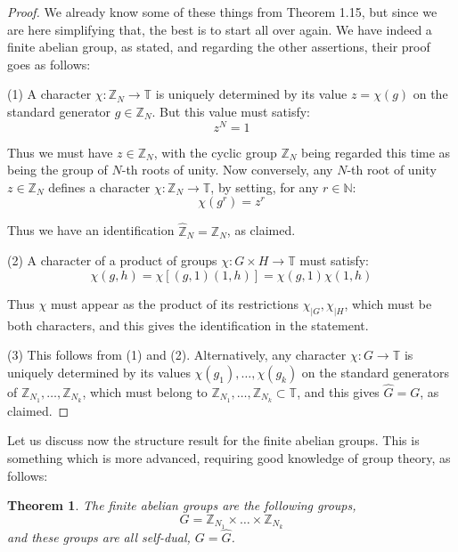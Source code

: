\documentclass[12pt]{amsbook}
\newtheorem{theorem}{Theorem}[chapter]
\begin{document}
\begin{proof}
We already know some of these things from Theorem 1.15, but since we are here simplifying that, the best is to start all over again. We have indeed a finite abelian group, as stated, and regarding the other assertions, their proof goes as follows:

\medskip

(1) A character $\chi:\mathbb Z_N\to\mathbb T$ is uniquely determined by its value $z=\chi(g)$ on the standard generator $g\in\mathbb Z_N$. But this value must satisfy:
$$z^N=1$$

Thus we must have $z\in\mathbb Z_N$, with the cyclic group $\mathbb Z_N$ being regarded this time as being the group of $N$-th roots of unity. Now conversely, any $N$-th root of unity $z\in\mathbb Z_N$ defines a character $\chi:\mathbb Z_N\to\mathbb T$, by setting, for any $r\in\mathbb N$:
$$\chi(g^r)=z^r$$

Thus we have an identification $\widehat{\mathbb Z}_N=\mathbb Z_N$, as claimed.

\medskip

(2) A character of a product of groups $\chi:G\times H\to\mathbb T$ must satisfy:
$$\chi(g,h)=\chi\left[(g,1)(1,h)\right]=\chi(g,1)\chi(1,h)$$

Thus $\chi$ must appear as the product of its restrictions $\chi_{|G},\chi_{|H}$, which must be both characters, and this gives the identification in the statement.

\medskip

(3) This follows from (1) and (2). Alternatively, any character $\chi:G\to\mathbb T$ is uniquely determined by its values $\chi(g_1),\ldots,\chi(g_k)$ on the standard generators of $\mathbb Z_{N_1},\ldots,\mathbb Z_{N_k}$, which must belong to $\mathbb Z_{N_1},\ldots,\mathbb Z_{N_k}\subset\mathbb T$, and this gives $\widehat{G}=G$, as claimed.
\end{proof}

Let us discuss now the structure result for the finite abelian groups. This is something which is more advanced, requiring good knowledge of group theory, as follows:


\begin{theorem}
The finite abelian groups are the following groups,
$$G=\mathbb Z_{N_1}\times\ldots\times\mathbb Z_{N_k}$$
and these groups are all self-dual, $G=\widehat{G}$.
\end{theorem}
\end{document}
